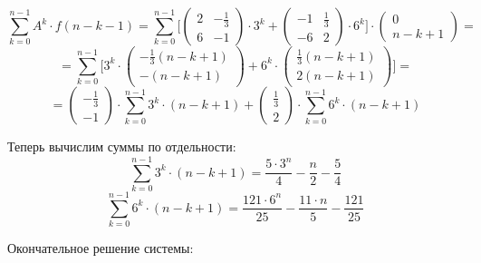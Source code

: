\begin{displaymath}
\sum_{k=0}^{n-1} A^k \cdot f(n-k-1) = \sum_{k=0}^{n-1} \Big [ \begin{pmatrix}
2 & - \frac{1}{3}
\\
6 & -1

\end{pmatrix} \cdot 3^k + \begin{pmatrix}
-1 & \frac{1}{3}
\\
-6 & 2
\end{pmatrix} \cdot 6^k \Big ] \cdot \begin{pmatrix}
0
\\
n-k+1
\end{pmatrix} = 
\end{displaymath}
\begin{displaymath}
= \sum_{k=0}^{n-1} \Big [ 3^k \cdot \begin{pmatrix}
- \frac{1}{3} (n-k+1)
\\
- (n-k+1)
\end{pmatrix} + 6^k \cdot \begin{pmatrix}
\frac{1}{3} (n-k+1)
\\
2 (n-k+1)
\end{pmatrix} \Big ] = 
\end{displaymath}
\begin{displaymath}
= \begin{pmatrix}
- \frac{1}{3}
\\
- 1
\end{pmatrix} \cdot \sum_{k=0}^{n-1} 3^k \cdot (n-k+1)  + \begin{pmatrix}
\frac{1}{3}
\\
2 
\end{pmatrix} \cdot  \sum_{k=0}^{n-1} 6^k \cdot (n-k+1)
\end{displaymath}

Теперь вычислим суммы по отдельности:
\begin{displaymath}
\sum_{k=0}^{n-1} 3^k \cdot (n-k+1) = \frac{5 \cdot 3^n}{4} - \frac{n}{2} - \frac{5}{4}
\end{displaymath}
\begin{displaymath}
\sum_{k=0}^{n-1} 6^k \cdot (n-k+1) = \frac{121 \cdot 6^n}{25} - \frac{11 \cdot n}{5} - \frac{121}{25}
\end{displaymath}

Окончательное решение системы:

